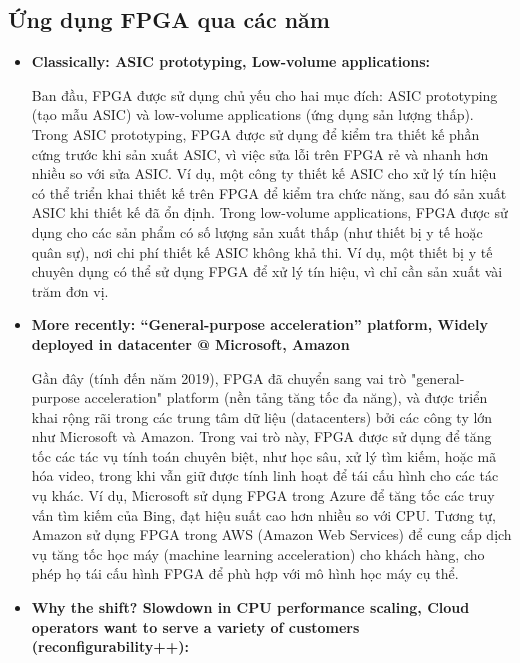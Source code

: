 \documentclass[a4paper]{article}
\begin{document}
\subsection{Ứng dụng FPGA qua các năm}
\begin{itemize} [label=-]
    \item \textbf{Classically: ASIC prototyping, Low-volume applications:} \par
    Ban đầu, FPGA được sử dụng chủ yếu cho hai mục đích: ASIC prototyping (tạo mẫu ASIC) và low-volume applications (ứng dụng sản lượng thấp). Trong ASIC prototyping, FPGA được sử dụng để kiểm tra thiết kế phần cứng trước khi sản xuất ASIC, vì việc sửa lỗi trên FPGA rẻ và nhanh hơn nhiều so với sửa ASIC. Ví dụ, một công ty thiết kế ASIC cho xử lý tín hiệu có thể triển khai thiết kế trên FPGA để kiểm tra chức năng, sau đó sản xuất ASIC khi thiết kế đã ổn định. Trong low-volume applications, FPGA được sử dụng cho các sản phẩm có số lượng sản xuất thấp (như thiết bị y tế hoặc quân sự), nơi chi phí thiết kế ASIC không khả thi. Ví dụ, một thiết bị y tế chuyên dụng có thể sử dụng FPGA để xử lý tín hiệu, vì chỉ cần sản xuất vài trăm đơn vị.
    \item \textbf{More recently: “General-purpose acceleration” platform, Widely deployed in datacenter @ Microsoft, Amazon} \par
    Gần đây (tính đến năm 2019), FPGA đã chuyển sang vai trò "general-purpose acceleration" platform (nền tảng tăng tốc đa năng), và được triển khai rộng rãi trong các trung tâm dữ liệu (datacenters) bởi các công ty lớn như Microsoft và Amazon. Trong vai trò này, FPGA được sử dụng để tăng tốc các tác vụ tính toán chuyên biệt, như học sâu, xử lý tìm kiếm, hoặc mã hóa video, trong khi vẫn giữ được tính linh hoạt để tái cấu hình cho các tác vụ khác. Ví dụ, Microsoft sử dụng FPGA trong Azure để tăng tốc các truy vấn tìm kiếm của Bing, đạt hiệu suất cao hơn nhiều so với CPU. Tương tự, Amazon sử dụng FPGA trong AWS (Amazon Web Services) để cung cấp dịch vụ tăng tốc học máy (machine learning acceleration) cho khách hàng, cho phép họ tái cấu hình FPGA để phù hợp với mô hình học máy cụ thể.
    \item \textbf{Why the shift? Slowdown in CPU performance scaling, Cloud operators want to serve a variety of customers (reconfigurability++):} \par

\end{itemize}
\end{document}
